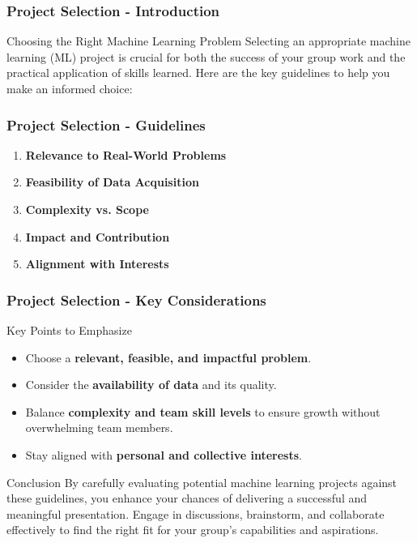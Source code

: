 \documentclass{beamer}
\begin{document}
\begin{frame}[fragile]
    \frametitle{Project Selection - Introduction}
    \begin{block}{Choosing the Right Machine Learning Problem}
        Selecting an appropriate machine learning (ML) project is crucial for both the success of your group work and the practical application of skills learned. Here are the key guidelines to help you make an informed choice:
    \end{block}
\end{frame}

\begin{frame}[fragile]
    \frametitle{Project Selection - Guidelines}
    \begin{enumerate}
        \item \textbf{Relevance to Real-World Problems}
        \item \textbf{Feasibility of Data Acquisition}
        \item \textbf{Complexity vs. Scope}
        \item \textbf{Impact and Contribution}
        \item \textbf{Alignment with Interests}
    \end{enumerate}
\end{frame}

\begin{frame}[fragile]
    \frametitle{Project Selection - Key Considerations}
    \begin{block}{Key Points to Emphasize}
        \begin{itemize}
            \item Choose a \textbf{relevant, feasible, and impactful problem}.
            \item Consider the \textbf{availability of data} and its quality.
            \item Balance \textbf{complexity and team skill levels} to ensure growth without overwhelming team members.
            \item Stay aligned with \textbf{personal and collective interests}.
        \end{itemize}
    \end{block}
    
    \begin{block}{Conclusion}
        By carefully evaluating potential machine learning projects against these guidelines, you enhance your chances of delivering a successful and meaningful presentation. Engage in discussions, brainstorm, and collaborate effectively to find the right fit for your group’s capabilities and aspirations.
    \end{block}
\end{frame}
\end{document}

